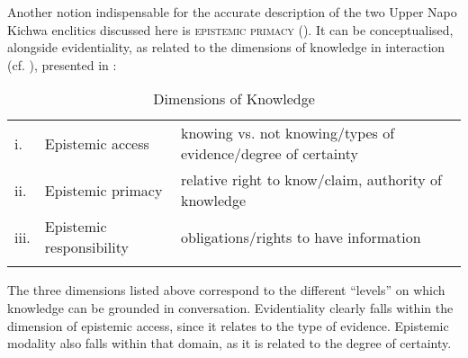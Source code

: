 \documentclass[output=paper]{langscibook}
\begin{document}
Another notion indispensable for the accurate description of the two Upper Napo Kichwa enclitics discussed here is \textsc{epistemic primacy} (\citealt{Stivers2011}). It can be conceptualised, alongside evidentiality, as related to the dimensions of knowledge in interaction (cf. \citealt[13]{Stivers2011}), presented in :

\begin{table}
\centering
\begin{tabularx}{\textwidth}{llQ}
\lsptoprule
i. & Epistemic access & knowing vs. not knowing/types of evidence/degree of certainty\\
\tablevspace
ii. & Epistemic primacy & relative right to know/claim, authority of knowledge\\
\tablevspace
iii. & Epistemic responsibility & obligations/rights to have information\\
\lspbottomrule
\end{tabularx}
\caption{Dimensions of Knowledge}\label{fig:kg1}
\end{table}

\hspace*{-3pt}The three dimensions listed above correspond to the different “levels” on which knowledge can be grounded in conversation. Evidentiality clearly falls within the dimension of epistemic access, since it relates to the type of evidence. Epistemic modality also falls within that domain, as it is related to the degree of certainty.
\end{document}
